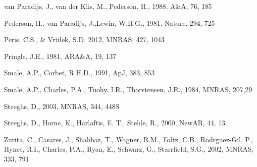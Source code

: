 \documentclass{aa}
\begin{document}
\begin{thebibliography}{}
 van Paradijs, J., van der Klis, M., Pederson, H., 1988, A\&A, 76, 185

 Pederson, H., van Paradijs, J.,Lewin, W.H.G., 1981, Nature, 294, 725

 Peris, C.S., \& Vrtilek, S.D. 2012, MNRAS, 427, 1043 

 Pringle, J.E., 1981, ARA\&A, 19, 137

 Smale, A.P., Corbet, R.H.D., 1991, ApJ, 383, 853

 Smale, A.P., Charles, P.A., Tuohy, I.R., Thorstensen, J.R., 1984, MNRAS, 207,29

 Steeghs, D., 2003, MNRAS, 344, 448S

	Steeghs, D., Horne, K., Harlaftis, E. T., Stehle, R., 2000,
NewAR, 44, 13.

 Zurita, C., Casares, J., Shahbaz, T., Wagner, R.M., Foltz, C.B., Rodrguez-Gil, P., Hynes, R.I., Charles, P.A., Ryan, E., Schwarz, G., Starrfield, S.G., 2002, MNRAS, 333, 791

\end{thebibliography}
\end{document}
